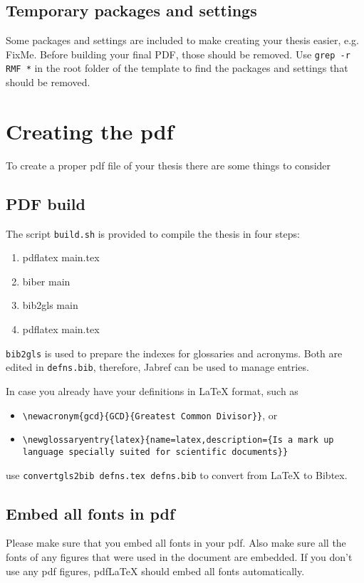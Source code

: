 \subsection{Temporary packages and settings}
Some packages and settings are included to make creating your thesis easier, e.g. FixMe.
Before building your final PDF, those should be removed. Use \verb|grep -r RMF *| in the root folder of the template to find the packages and settings that should be removed.

\section{Creating the pdf}
To create a proper pdf file of your thesis there are some things to consider

\subsection{PDF build}
The script \verb|build.sh| is provided to compile the thesis in four steps:
\begin{enumerate}
	\item pdflatex main.tex
	\item biber main
	\item bib2gls main
	\item pdflatex main.tex
\end{enumerate}
\verb+bib2gls+ is used to prepare the indexes for glossaries and acronyms. Both are edited in \verb|defns.bib|, therefore, Jabref can be used to manage entries. 

In case you already have your definitions in \LaTeX{} format, such as
\begin{itemize}
	\item \verb|\newacronym{gcd}{GCD}{Greatest Common Divisor}}|, or
	\item \verb|\newglossaryentry{latex}{name=latex,description={Is a mark up language specially suited for scientific documents}}|
\end{itemize}
use \verb|convertgls2bib defns.tex defns.bib| to convert from \LaTeX{} to Bibtex.

\subsection{Embed all fonts in pdf}
Please make sure that you embed all fonts in your pdf. Also make sure all the fonts of any figures that were used in the document are embedded. 
If you don't use any pdf figures, pdfLaTeX should embed all fonts automatically.

